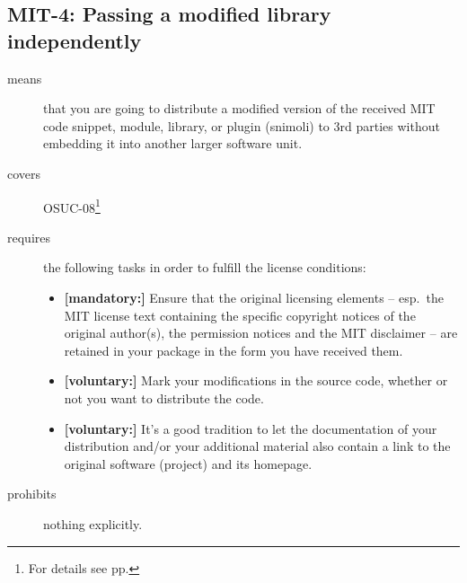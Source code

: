 \subsection{MIT-4: Passing a modified library independently}
\label{OSUC-08-MIT}
\begin{description}
\item[means] that you are going to distribute a modified version of the received
MIT code snippet, module, library, or plugin (snimoli) to 3rd parties without
embedding it into another larger software unit.
\item[covers] OSUC-08\footnote{For details see pp. \pageref{OSUC-08-DEF}}
\item[requires] the following tasks in order to fulfill the license conditions:
\begin{itemize}
  \item \textbf{[mandatory:]} Ensure that the original licensing elements -- esp.\
  the MIT license text containing the specific copyright notices of the original
  author(s), the permission notices and the MIT disclaimer -- are retained in
  your package in the form you have received them.
  \item \textbf{[voluntary:]} Mark your modifications in the source code,
  whether or not you want to distribute the code.
  \item \textbf{[voluntary:]} It's a good tradition to let the documentation of
  your distribution and/or your additional material also contain a link to the
  original software (project) and its homepage.
\end{itemize}
\item[prohibits] nothing explicitly.
\end{description}


